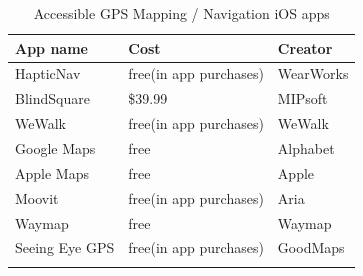 \documentclass[14pt, letterpaper,twoside]{extreport}
\begin{document}

\begin{longtable}[]{@{} 
 >{\raggedright\arraybackslash}p{}
 >{\raggedright\arraybackslash}p{}
 >{\raggedright\arraybackslash}p{}@{}
 }
\toprule\noalign{}
App name & Cost & Creator \\
\midrule\noalign{}
\endhead
\bottomrule\noalign{}
\endlastfoot
HapticNav & free(in app purchases) & WearWorks \\[1.0em]
BlindSquare & \$39.99 & MIPsoft \\[1.0em]
WeWalk & free(in app purchases) & WeWalk \\[1.0em]
Google Maps & free & Alphabet \\[1.0em]
Apple Maps & free & Apple \\[1.0em]
Moovit & free(in app purchases) & Aria \\[1.0em]
Waymap & free & Waymap \\[1.0em]
Seeing Eye GPS & free(in app purchases) & GoodMaps \\[1.0em]\hline
\caption{Accessible GPS Mapping / Navigation iOS apps }
\end{longtable}
\end{document}
